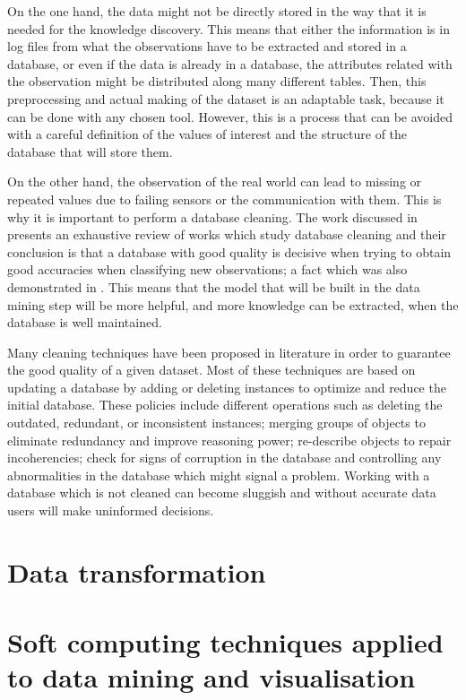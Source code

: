 On the one hand, the data might not be directly stored in the way that it is needed for the knowledge discovery. This means that either the information is in log files from what the observations have to be extracted and stored in a database, or even if the data is already in a database, the attributes related with the observation might be distributed along many different tables. Then, this preprocessing and actual making of the dataset is an adaptable task, because it can be done with any chosen tool. However, this is a process that can be avoided with a careful definition of the values of interest and the structure of the database that will store them.

On the other hand, the observation of the real world can lead to missing or repeated values due to failing sensors or the communication with them. This is why it is important to perform a database cleaning. The work discussed in \cite{wilson2001maintaining} presents an exhaustive review of works which study database cleaning and their conclusion is that a database with good quality is decisive when trying to obtain good accuracies when classifying new observations; a fact which was also demonstrated in \cite{zeineb2014thesis}. This means that the model that will be built in the data mining step will be more helpful, and more knowledge can be extracted, when the database is well maintained.

Many cleaning techniques have been proposed in literature \cite{wilson2001maintaining} in order to guarantee the good quality of
a given dataset.   Most of these techniques are based on updating a database by adding or deleting instances to optimize and reduce the initial database. These policies include different operations such as deleting the outdated, redundant, or inconsistent instances; merging groups of objects to eliminate redundancy and improve reasoning power; re-describe objects to repair incoherencies; check for signs of corruption in the database and controlling any abnormalities in the database which might signal a problem. Working with a database which is not cleaned can become sluggish and without accurate data users will make uninformed decisions.

\section{Data transformation}

\section{Soft computing techniques applied to data mining and visualisation}

